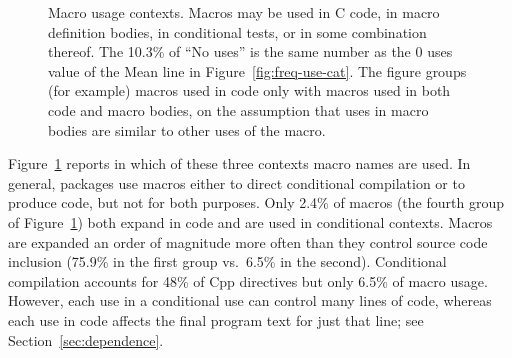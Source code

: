 \documentclass[10pt]{article}
\newcommand{\captionsmall}[1]{\caption[]{\small #1}}
\begin{document}
\begin{figure}
\centerline{\small \setlength{\tabcolsep}{.25em} }
\captionsmall{Macro usage contexts.  Macros may be used in C code, in
  macro definition bodies, in conditional tests, or in some combination
  thereof.  The 10.3\%
  of ``No uses'' is the same number as the 0 uses value of the Mean line in
  Figure~\ref{fig:freq-use-cat}.
  The figure groups (for example) macros used in code only with macros used
  in both code and macro bodies, on the assumption that uses in macro
  bodies are similar to other uses of the macro.}
\label{fig:where-used}
\end{figure}



Figure~\ref{fig:where-used} reports in which of these three contexts macro
names are used.  In general, packages use macros either to direct
conditional compilation or to produce code, but not for both purposes.
Only 2.4\% of macros (the fourth group of Figure~\ref{fig:where-used}) both
expand in code and are used in conditional contexts.  Macros are expanded
an order of magnitude more often than they control source code inclusion
(75.9\% in the first group vs.\ 6.5\% in the second).  Conditional
compilation accounts for 48\% of Cpp directives but only 6.5\% of macro
usage.  However, each use in a conditional use can control many lines of
code, whereas each use in code affects the final program text for just that
line; see Section~\ref{sec:dependence}.



\end{document}
